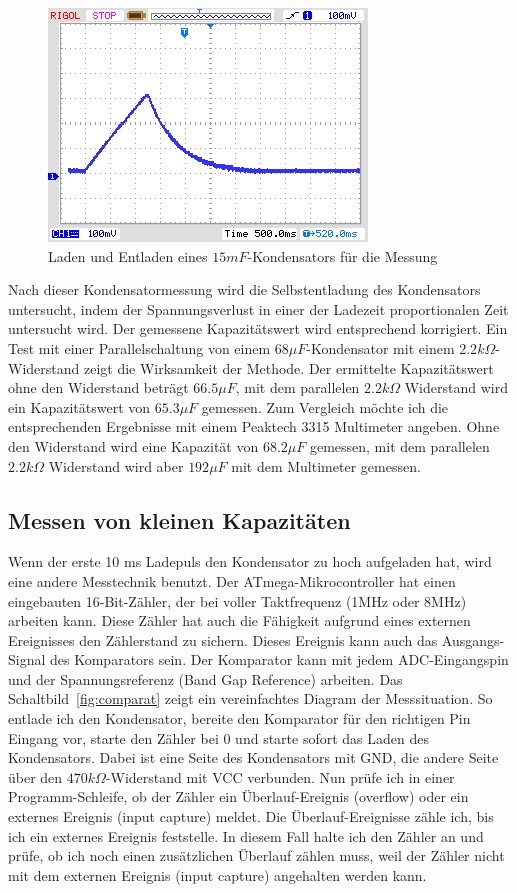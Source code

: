 \begin{figure}[H]
  \centering
    \includegraphics[]{../PNG/charge_15mF.png}
  \caption{Laden und Entladen eines \(15mF\)-Kondensators für die Messung}
  \label{pic:c15mF}
\end{figure}

Nach dieser Kondensatormessung wird die Selbstentladung des Kondensators untersucht, indem der
Spannungsverlust in einer der Ladezeit proportionalen Zeit untersucht wird.
Der gemessene Kapazitätswert wird entsprechend korrigiert. Ein Test mit einer Parallelschaltung von
einem \(68 \mu F\)-Kondensator mit einem \(2.2 k\Omega\)-Widerstand zeigt die
Wirksamkeit der Methode. Der ermittelte Kapazitätswert ohne den Widerstand beträgt \(66.5 \mu F\),
mit dem parallelen \(2.2 k\Omega\) Widerstand wird ein Kapazitätswert von \(65.3 \mu F\) gemessen.
Zum Vergleich möchte ich die entsprechenden Ergebnisse mit einem Peaktech 3315 Multimeter angeben.
Ohne den Widerstand wird eine Kapazität von \(68.2 \mu F\) gemessen, mit dem parallelen \(2.2 k\Omega\)
Widerstand wird aber \(192 \mu F\) mit dem Multimeter gemessen.

\subsection{Messen von kleinen Kapazitäten}
Wenn der erste 10 ms Ladepuls den Kondensator zu hoch aufgeladen hat, wird eine andere Messtechnik benutzt.
Der ATmega-Mikrocontroller hat einen eingebauten 16-Bit-Zähler, der bei voller Taktfrequenz (1MHz oder 8MHz) arbeiten kann.
Diese Zähler hat auch die Fähigkeit aufgrund eines externen Ereignisses den Zählerstand zu sichern.
Dieses Ereignis kann auch das Ausgangs-Signal des Komparators sein.
Der Komparator kann mit jedem ADC-Eingangspin und der Spannungsreferenz (Band Gap Reference) arbeiten.
Das Schaltbild~\ref{fig:comparat} zeigt ein vereinfachtes Diagram der Messsituation.
So entlade ich den Kondensator, bereite den Komparator für den richtigen Pin Eingang vor, starte den Zähler bei 0 und
starte sofort das Laden des Kondensators.
Dabei ist eine Seite des Kondensators mit GND, die andere Seite über den \(470k\Omega\)-Widerstand mit VCC verbunden.
Nun prüfe ich in einer Programm-Schleife, ob der Zähler ein Überlauf-Ereignis (overflow) oder ein
 externes Ereignis (input capture) meldet.
Die Überlauf-Ereignisse zähle ich, bis ich ein externes Ereignis feststelle.
In diesem Fall halte ich den Zähler an und prüfe, ob ich noch einen zusätzlichen Überlauf zählen muss, 
weil der Zähler nicht mit dem externen Ereignis (input capture) angehalten werden kann.


